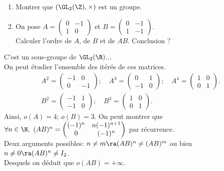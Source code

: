 \documentclass[11pt]{article}
\begin{document}
\begin{ex}{}{}
    \begin{enumerate}
        \item Montrer que $(\GL_2(\Z),\times)$ est un groupe.
        \item On pose $A=\begin{pmatrix}0&-1\\1&0\end{pmatrix}$ et $B=\begin{pmatrix}0&-1\\1&-1\end{pmatrix}$.\\
        Calculer l'ordre de $A$, de $B$ et de $AB$. Conclusion ?
    \end{enumerate}
    \tcblower
     C'est un sous-groupe de $\GL_2(\R)$...\\
     On peut étudier l'ensemble des itérés de ces matrices.
    \begin{align*}
        &A^2=\begin{pmatrix}-1&0\\0&-1\end{pmatrix}; \quad A^3=\begin{pmatrix}0&1\\-1&0\end{pmatrix}; \quad A^4=\begin{pmatrix}1&0\\0&1\end{pmatrix}.\\
        &B^2=\begin{pmatrix}-1&1\\-1&0\end{pmatrix}; \quad B^3=\begin{pmatrix}1&0\\0&1\end{pmatrix}.
    \end{align*}
    Ainsi, $o(A)=4$; $o(B)=3$.\n
    On peut montrer que $\forall n \in \N, ~ (AB)^n=\begin{pmatrix}(-1)^n&n(-1)^{n+1}\\0&(-1)^n\end{pmatrix}$ par récurrence.\\
    Deux arguments possibles: $n\neq m\ra (AB)^n\neq(AB)^m$ ou bien $n\neq0\ra(AB)^n\neq I_2$.\\
    Desquels on déduit que $o(AB)=+\infty$.
\end{ex}

\vspace*{-0.8cm}
\end{document}
